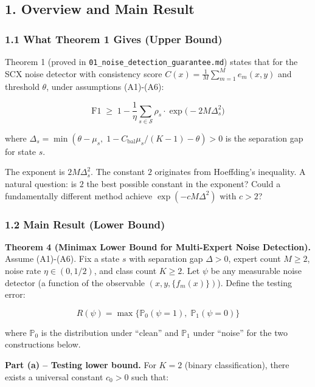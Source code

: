 \documentclass[
  12pt,
]{ctexart}
\begin{document}
\subsection{1. Overview and Main Result}\label{overview-and-main-result}

\subsubsection{1.1 What Theorem 1 Gives (Upper
Bound)}\label{what-theorem-1-gives-upper-bound}

Theorem 1 (proved in \texttt{01\_noise\_detection\_guarantee.md}) states
that for the SCX noise detector with consistency score
\(C(x) = \frac{1}{M}\sum_{m=1}^M e_m(x,y)\) and threshold \(\theta\),
under assumptions (A1)-(A6):

\[\text{F1} \;\geq\; 1 - \frac{1}{\eta} \sum_{s \in \mathcal{S}} \rho_s \cdot \exp\!\bigl(-2M\Delta_s^2\bigr)\]

where
\(\Delta_s = \min(\theta - \mu_s,\; 1 - C_{\text{bal}}\mu_s/(K-1) - \theta) > 0\)
is the separation gap for state \(s\).

The exponent is \(2M\Delta_s^2\). The constant \(2\) originates from
Hoeffding's inequality. A natural question: is \(2\) the best possible
constant in the exponent? Could a fundamentally different method achieve
\(\exp(-cM\Delta^2)\) with \(c > 2\)?

\subsubsection{1.2 Main Result (Lower
Bound)}\label{main-result-lower-bound}

\textbf{Theorem 4 (Minimax Lower Bound for Multi-Expert Noise
Detection).} Assume (A1)-(A6). Fix a state \(s\) with separation gap
\(\Delta > 0\), expert count \(M \geq 2\), noise rate
\(\eta \in (0, 1/2)\), and class count \(K \geq 2\). Let \(\psi\) be any
measurable noise detector (a function of the observable
\((x, y, \{f_m(x)\})\)). Define the testing error:

\[R(\psi) = \max\bigl\{\mathbb{P}_0(\psi = 1),\; \mathbb{P}_1(\psi = 0)\bigr\}\]

where \(\mathbb{P}_0\) is the distribution under ``clean'' and
\(\mathbb{P}_1\) under ``noise'' for the two constructions below.

\textbf{Part (a) -- Testing lower bound.} For \(K=2\) (binary
classification), there exists a universal constant \(c_0 > 0\) such
that:
\end{document}
